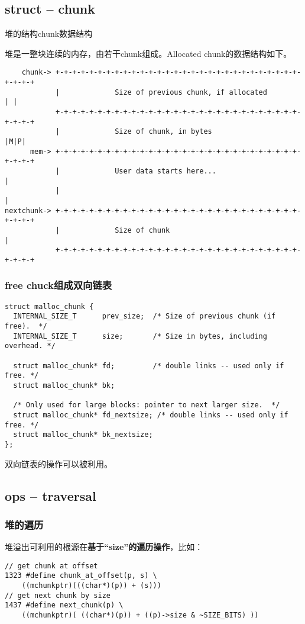 \documentclass[t]{beamer}
\begin{document}
\subsection{struct -- chunk}
\begin{frame}[fragile]{\kaishu 堆的结构}{\fangsong chunk数据结构}

堆是一整块连续的内存，由若干chunk组成。Allocated chunk的数据结构如下。
{\scriptsize
\begin{verbatim}
    chunk-> +-+-+-+-+-+-+-+-+-+-+-+-+-+-+-+-+-+-+-+-+-+-+-+-+-+-+-+-+-+-+-+-+
            |             Size of previous chunk, if allocated            | |
            +-+-+-+-+-+-+-+-+-+-+-+-+-+-+-+-+-+-+-+-+-+-+-+-+-+-+-+-+-+-+-+-+
            |             Size of chunk, in bytes                       |M|P|
      mem-> +-+-+-+-+-+-+-+-+-+-+-+-+-+-+-+-+-+-+-+-+-+-+-+-+-+-+-+-+-+-+-+-+
            |             User data starts here...                          |
            |                                                               |
nextchunk-> +-+-+-+-+-+-+-+-+-+-+-+-+-+-+-+-+-+-+-+-+-+-+-+-+-+-+-+-+-+-+-+-+
            |             Size of chunk                                     |
            +-+-+-+-+-+-+-+-+-+-+-+-+-+-+-+-+-+-+-+-+-+-+-+-+-+-+-+-+-+-+-+-+
\end{verbatim}}
\end{frame}

\begin{frame}[fragile]
\frametitle{\kaishu free chuck组成双向链表}
\begin{lstlisting}[basicstyle=\scriptsize]
struct malloc_chunk {
  INTERNAL_SIZE_T      prev_size;  /* Size of previous chunk (if free).  */
  INTERNAL_SIZE_T      size;       /* Size in bytes, including overhead. */

  struct malloc_chunk* fd;         /* double links -- used only if free. */
  struct malloc_chunk* bk;

  /* Only used for large blocks: pointer to next larger size.  */
  struct malloc_chunk* fd_nextsize; /* double links -- used only if free. */
  struct malloc_chunk* bk_nextsize;
};
\end{lstlisting}

双向链表的操作可以被利用。

\end{frame}

\subsection{ops -- traversal}
\begin{frame}[fragile]
\frametitle{\kaishu 堆的遍历}
堆溢出可利用的根源在\textbf{基于``size''的遍历操作}，比如：
\begin{lstlisting}
// get chunk at offset
1323 #define chunk_at_offset(p, s) \
    ((mchunkptr)(((char*)(p)) + (s)))
// get next chunk by size
1437 #define next_chunk(p) \
    ((mchunkptr)( ((char*)(p)) + ((p)->size & ~SIZE_BITS) ))
\end{lstlisting}
\end{frame}
\end{document}

